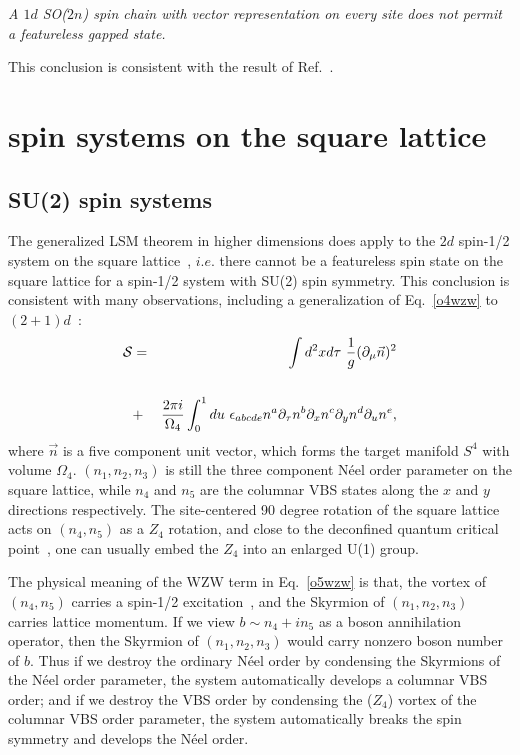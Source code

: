 \documentclass[aps,prb,twocolumn,superscriptaddress,showpacs]{revtex4}
\newcommand{\beqn}{\begin{eqnarray}}
\newcommand{\eeqn}{\end{eqnarray}}
\begin{document}
{\it A $1d$ SO($2n$) spin chain with vector representation on
every site does not permit a featureless gapped state. }

This conclusion is consistent with the result of
Ref.~.

\section{spin systems on the square lattice}

\subsection{SU(2) spin systems}

The generalized LSM theorem in higher dimensions does apply to the
$2d$ spin-1/2 system on the square
lattice~\cite{oshikawa,hastings}, $i.e.$ there cannot be a
featureless spin state on the square lattice for a spin-1/2 system
with SU(2) spin symmetry. This conclusion is consistent with many
observations, including a generalization of Eq.~\ref{o4wzw} to
$(2+1)d$~\cite{senthilfisher}: \beqn \mathcal{S} &=& \int d^2x
d\tau \ \frac{1}{g}(\partial_\mu \vec{n})^2 \cr\cr &+& \frac{2\pi
i}{\Omega_4} \int_0^1 du \ \epsilon_{abcde} n^a
\partial_\tau n^b
\partial_x n^c
\partial_y n^d \partial_u n^e, \label{o5wzw} \eeqn where $\vec{n}$
is a five component unit vector, which forms the target manifold
$S^4$ with volume $\Omega_4$. $(n_1, n_2, n_3)$ is still the three
component N\'{e}el order parameter on the square lattice, while
$n_4$ and $n_5$ are the columnar VBS states along the $x$ and $y$
directions respectively. The site-centered 90 degree rotation of
the square lattice acts on $(n_4, n_5)$ as a $Z_4$ rotation, and
close to the deconfined quantum critical
point~\cite{deconfine1,deconfine2}, one can usually embed the
$Z_4$ into an enlarged U(1) group.

The physical meaning of the WZW term in Eq.~\ref{o5wzw} is that,
the vortex of $(n_4, n_5)$ carries a spin-1/2
excitation~\cite{levinsenthil}, and the Skyrmion of $(n_1, n_2,
n_3)$ carries lattice momentum. If we view $b \sim n_4 + in_5$ as
a boson annihilation operator, then the Skyrmion of $(n_1, n_2,
n_3)$ would carry nonzero boson number of $b$. Thus if we destroy
the ordinary N\'{e}el order by condensing the Skyrmions of the
N\'{e}el order parameter, the system automatically develops a
columnar VBS order; and if we destroy the VBS order by condensing
the ($Z_4$) vortex of the columnar VBS order parameter, the system
automatically breaks the spin symmetry and develops the N\'{e}el
order.
\end{document}
